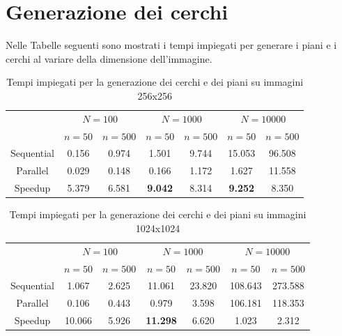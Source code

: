 \section{Generazione dei cerchi}\label{sec:generazione-dei-cerchi}
Nelle Tabelle seguenti sono mostrati i tempi impiegati per generare i piani e i cerchi al variare della dimensione dell'immagine.

\begin{table}[H]
    \centering
    \begin{tabular}{c|c|c|c|c|c|c|}
        & \multicolumn{2}{|c|}{$N = 100$} & \multicolumn{2}{|c|}{$N = 1000$} & \multicolumn{2}{|c|}{$N = 10000$} \\
        & $n=50$ & $n=500$ & $n=50$ & $n=500$ & $n=50$ & $n=500$ \\
        \hline
        Sequential & 0.156 & 0.974 & 1.501 & 9.744 & 15.053 & 96.508 \\
        Parallel & 0.029 & 0.148 & 0.166 & 1.172 & 1.627 & 11.558 \\
        Speedup & 5.379 & 6.581 & \textbf{9.042} & 8.314 & \textbf{9.252} & 8.350 \\
    \end{tabular}
    \caption{\label{tab:gen256}Tempi impiegati per la generazione dei cerchi e dei piani su immagini 256x256}
\end{table}

\begin{table}[H]
    \centering
    \begin{tabular}{c|c|c|c|c|c|c|}
        & \multicolumn{2}{|c|}{$N = 100$} & \multicolumn{2}{|c|}{$N = 1000$} & \multicolumn{2}{|c|}{$N = 10000$} \\
        & $n=50$ & $n=500$ & $n=50$ & $n=500$ & $n=50$ & $n=500$ \\
        \hline
        Sequential & 1.067 & 2.625 & 11.061 & 23.820 & 108.643 & 273.588 \\
        Parallel & 0.106 & 0.443 & 0.979 & 3.598 & 106.181 & 118.353 \\
        Speedup & 10.066 & 5.926 & \textbf{11.298} & 6.620 & 1.023 & 2.312 \\
    \end{tabular}
    \caption{\label{tab:gen1024}Tempi impiegati per la generazione dei cerchi e dei piani su immagini 1024x1024}
\end{table}

\clearpage

